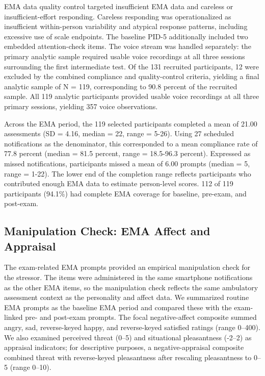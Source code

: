 \documentclass[
  english,
  man,floatsintext]{apa6}
\begin{document}
EMA data quality control targeted insufficient EMA data and careless or insufficient-effort responding. Careless responding was operationalized as insufficient within-person variability and atypical response patterns, including excessive use of scale endpoints. The baseline PID-5 additionally included two embedded attention-check items. The voice stream was handled separately: the primary analytic sample required usable voice recordings at all three sessions surrounding the first intermediate test. Of the 131 recruited participants, 12 were excluded by the combined compliance and quality-control criteria, yielding a final analytic sample of N = 119, corresponding to 90.8 percent of the recruited sample. All 119 analytic participants provided usable voice recordings at all three primary sessions, yielding 357 voice observations.

Across the EMA period, the 119 selected participants completed a mean of 21.00 assessments (SD = 4.16, median = 22, range = 5-26). Using 27 scheduled notifications as the denominator, this corresponded to a mean compliance rate of 77.8 percent (median = 81.5 percent, range = 18.5-96.3 percent). Expressed as missed notifications, participants missed a mean of 6.00 prompts (median = 5, range = 1-22). The lower end of the completion range reflects participants who contributed enough EMA data to estimate person-level scores. 112 of 119 participants (94.1\%) had complete EMA coverage for baseline, pre-exam, and post-exam.

\subsection{Manipulation Check: EMA Affect and Appraisal}\label{s-mc}

The exam-related EMA prompts provided an empirical manipulation check for the stressor. The items were administered in the same smartphone notifications as the other EMA items, so the manipulation check reflects the same ambulatory assessment context as the personality and affect data. We summarized routine EMA prompts as the baseline EMA period and compared these with the exam-linked pre- and post-exam prompts. The focal negative-affect composite summed angry, sad, reverse-keyed happy, and reverse-keyed satisfied ratings (range 0--400). We also examined perceived threat (0--5) and situational pleasantness (-2--2) as appraisal indicators; for descriptive purposes, a negative-appraisal composite combined threat with reverse-keyed pleasantness after rescaling pleasantness to 0--5 (range 0--10).
\end{document}
